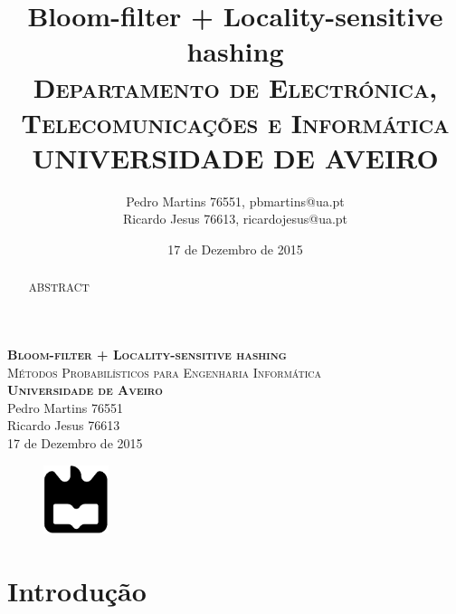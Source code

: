 \documentclass[a4paper,11pt,openright,oneside]{report}
\begin{document}
\begin{titlepage}
\begin{center}

{\vspace*{50mm}\textsc{\Huge\textbf{Bloom-filter + Locality-sensitive hashing}\\ \small{Métodos Probabilísticos para Engenharia Informática}}}\\[2cm]
{\textsc{\small\textbf{Universidade de Aveiro}}}\\[0.5cm]
{\small Pedro Martins 76551\\Ricardo Jesus 76613}\\[0.5cm]
{\small	17 de Dezembro de 2015}\\

\begin{figure}[b]
\center
\graphicspath{}
\includegraphics[height=2cm]{ua.pdf}
\end{figure}

\end{center}

\end{titlepage}

\title{\textbf{Bloom-filter + Locality-sensitive hashing}\\[1cm]\textsc{\small {Departamento de Electrónica, Telecomunicações e Informática} \\ \large {UNIVERSIDADE DE AVEIRO}}}
\author{Pedro Martins 76551, pbmartins@ua.pt\\Ricardo Jesus 76613, ricardojesus@ua.pt}
\date{17 de Dezembro de 2015}

\maketitle


\begin{abstract}

ABSTRACT

\end{abstract}

\tableofcontents
\listoffigures

\clearpage
{}

\chapter{Introdução}
\label{chap.introdução}
\end{document}
